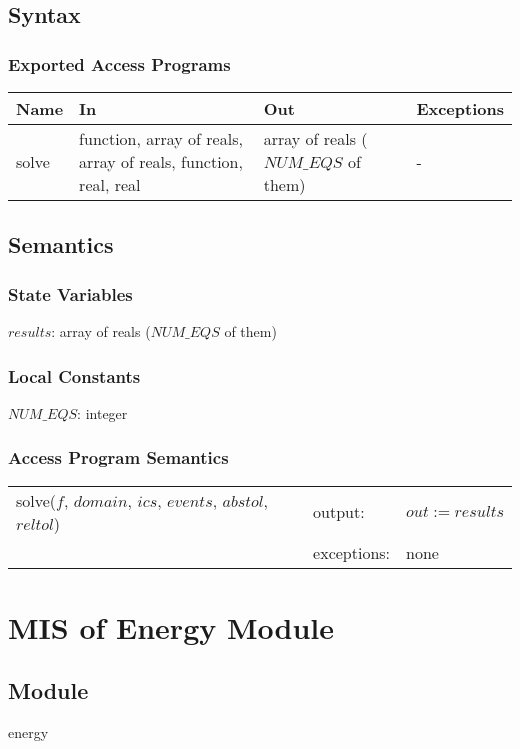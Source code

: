 \documentclass[12pt]{article}
\begin{document}
\subsection{Syntax}
\subsubsection{Exported Access Programs}
\begin{center}
\begin{tabular}{p{2cm} p{5cm} p{5cm} p{2cm}}
\hline
\textbf{Name} & \textbf{In} & \textbf{Out} & \textbf{Exceptions} \\
\hline
solve & function, array of reals, array of reals, function, real, real & array of reals ($NUM\_EQS$ of them) & - \\
\hline 
\end{tabular}
\end{center}
\subsection{Semantics}
\subsubsection{State Variables}
$results$: array of reals ($NUM\_EQS$ of them)
\subsubsection{Local Constants}
$NUM\_EQS$: integer
\subsubsection{Access Program Semantics}
\begin{center}
\begin{tabular}{l l p{10cm}}
solve($f$, $domain$, $ics$, $events$, $abstol$, $reltol$) & output: & $out := results$ \\
& exceptions: & none \\
\end{tabular}
\end{center}

\section{MIS of Energy Module} \label{Energy}
\subsection{Module}
energy
\end{document}
